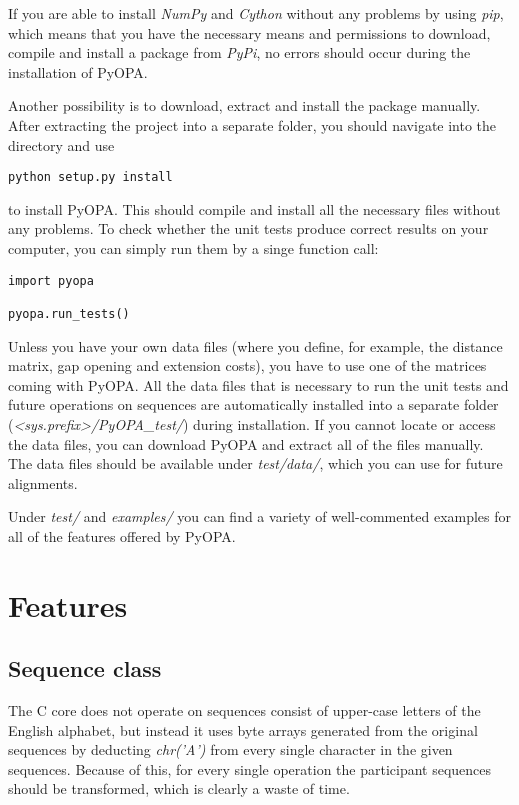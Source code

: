 \documentclass[12pt]{article}
\newcommand{\pp}{PyOPA}
\begin{document}
If you are able to install \emph{NumPy} and \emph{Cython} without any problems by using \emph{pip}, which means that you have the necessary means and permissions to download, compile and install a package from \emph{PyPi}, no errors should occur during the installation of \pp{}.

Another possibility is to download, extract and install the package manually. After extracting the project into a separate folder, you should navigate into the directory and use

\begin{lstlisting}
python setup.py install
\end{lstlisting}

to install \pp{}. This should compile and install all the necessary files without any problems. To check whether the unit tests produce correct results on your computer, you can simply run them by a singe function call:
\begin{lstlisting}
import pyopa

pyopa.run_tests()
\end{lstlisting}

Unless you have your own data files (where you define, for example, the distance matrix, gap opening and extension costs), you have to use one of the matrices coming with \pp{}. All the data files that is necessary to run the unit tests and future operations on sequences are automatically installed into a separate folder (\emph{\textless{}sys.prefix\textgreater/\pp{}\_test/}) during installation. If you cannot locate or access the data files, you can download \pp{} and extract all of the files manually. The data files should be available under \emph{test/data/}, which you can use for future alignments. 

Under \emph{test/} and \emph{examples/} you can find a variety of well-commented examples for all of the features offered by \pp{}.

\section{Features}
\label{sec:features}

\subsection{Sequence class}
\label{subsec:normseq}
The C core does not operate on sequences consist of upper-case letters of the English alphabet, but instead it uses byte arrays generated from the original sequences by deducting \emph{chr('A')} from every single character in the given sequences. Because of this, for every single operation the participant sequences should be transformed, which is clearly a waste of time.
\end{document}
